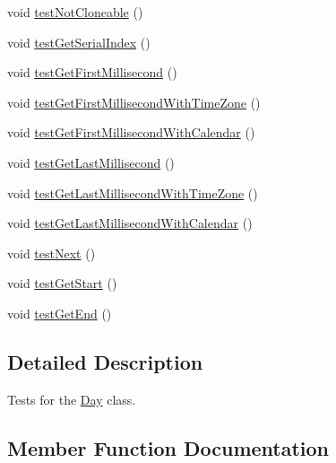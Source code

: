 \begin{DoxyCompactItemize}
\item 
void \mbox{\hyperlink{classorg_1_1jfree_1_1data_1_1time_1_1_day_test_a8c9d9735dc1132493daf582406b6e56d}{test\+Not\+Cloneable}} ()
\item 
void \mbox{\hyperlink{classorg_1_1jfree_1_1data_1_1time_1_1_day_test_a0cf5304043936cfb3b6caf699fbf4914}{test\+Get\+Serial\+Index}} ()
\item 
void \mbox{\hyperlink{classorg_1_1jfree_1_1data_1_1time_1_1_day_test_ab4551687992c41557ad0c03261fb3751}{test\+Get\+First\+Millisecond}} ()
\item 
void \mbox{\hyperlink{classorg_1_1jfree_1_1data_1_1time_1_1_day_test_aa883332d7687591065234728c2758ee5}{test\+Get\+First\+Millisecond\+With\+Time\+Zone}} ()
\item 
void \mbox{\hyperlink{classorg_1_1jfree_1_1data_1_1time_1_1_day_test_a56a959d1ee8039ff2da396245f58add6}{test\+Get\+First\+Millisecond\+With\+Calendar}} ()
\item 
void \mbox{\hyperlink{classorg_1_1jfree_1_1data_1_1time_1_1_day_test_a6b92872cc7b2e1aa6613f6c22b3f3322}{test\+Get\+Last\+Millisecond}} ()
\item 
void \mbox{\hyperlink{classorg_1_1jfree_1_1data_1_1time_1_1_day_test_a5ff9b0765182bdf4665740ca85cd445a}{test\+Get\+Last\+Millisecond\+With\+Time\+Zone}} ()
\item 
void \mbox{\hyperlink{classorg_1_1jfree_1_1data_1_1time_1_1_day_test_ad0e76e68d600d8b4fa4f356ace100e56}{test\+Get\+Last\+Millisecond\+With\+Calendar}} ()
\item 
void \mbox{\hyperlink{classorg_1_1jfree_1_1data_1_1time_1_1_day_test_a0d8cbed22992cde61a2a5c72a944e115}{test\+Next}} ()
\item 
void \mbox{\hyperlink{classorg_1_1jfree_1_1data_1_1time_1_1_day_test_a4bf08eabfaea061a702a914d6e69dbc5}{test\+Get\+Start}} ()
\item 
void \mbox{\hyperlink{classorg_1_1jfree_1_1data_1_1time_1_1_day_test_a35ec26de3f02f890c9e4fd0bbd4729a9}{test\+Get\+End}} ()
\end{DoxyCompactItemize}


\subsection{Detailed Description}
Tests for the \mbox{\hyperlink{classorg_1_1jfree_1_1data_1_1time_1_1_day}{Day}} class. 

\subsection{Member Function Documentation}
\mbox{\label{classorg_1_1jfree_1_1data_1_1time_1_1_day_test_a4fe4cc974ebaa125bd4fe90bf14b99cf}} 
